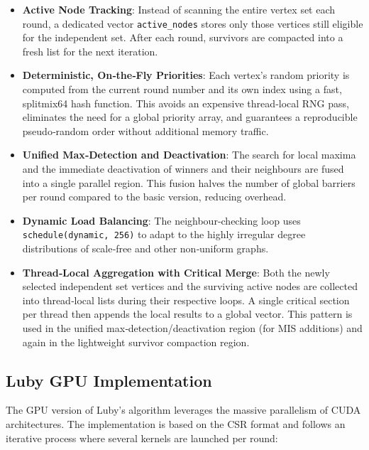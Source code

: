 \documentclass{article}
\begin{document}
\begin{itemize}
    \item \textbf{Active Node Tracking}:
        Instead of scanning the entire vertex set each round, a dedicated vector \texttt{active\_nodes}
        stores only those vertices still eligible for the independent set.
        After each round, survivors are compacted into a fresh list for the next iteration.

    \item \textbf{Deterministic, On‑the‑Fly Priorities}:
        Each vertex’s random priority is computed from the current round number and its own index
        using a fast, splitmix64 hash function.
        This avoids an expensive thread‑local RNG pass, eliminates the need for a global priority array,
        and guarantees a reproducible pseudo‑random order without additional memory traffic.

    \item \textbf{Unified Max‑Detection and Deactivation}:
        The search for local maxima and the immediate deactivation of winners and their neighbours
        are fused into a single parallel region.
        This fusion halves the number of global barriers per round compared to the basic version,
        reducing overhead.

    \item \textbf{Dynamic Load Balancing}:
        The neighbour‑checking loop uses \texttt{schedule(dynamic, 256)} to adapt to the
        highly irregular degree distributions of scale‑free and other non‑uniform graphs.

    \item \textbf{Thread‑Local Aggregation with Critical Merge}:
        Both the newly selected independent set vertices and the surviving active nodes
        are collected into thread‑local lists during their respective loops.
        A single critical section per thread then appends the local results to a global
        vector.
        This pattern is used in the unified max‑detection/deactivation region (for MIS
        additions) and again in the lightweight survivor compaction region.
\end{itemize}

\subsection{Luby GPU Implementation}
The GPU version of Luby's algorithm leverages the massive parallelism of CUDA architectures. The implementation is based on the CSR format and follows an iterative process where several kernels are launched per round:
\end{document}
